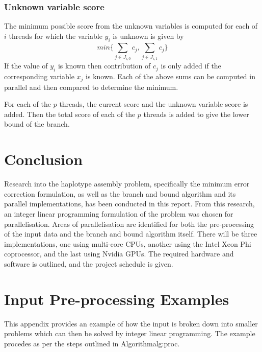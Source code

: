 \documentclass[10pt,a4paer,twocolumn]{article}
\begin{document}
\subsubsection{Unknown variable score}
The minimum possible score from the unknown variables is computed for each of $i$ threads for which the
variable $y_i$ is unknown is given by
\begin{equation*}
    min\{\sum_{j \in J_{i,0}}^{}{c_j}, \sum_{j \in J_{i,1}}^{}{c_j}\} 
\end{equation*}
If the value of $y_i$ is known then contribution of $c_j$ is only added if the corresponding variable $x_j$ is
known.
Each of the above sums can be computed in parallel and then compared to determine the minimum. 

For each of the $p$ threads, the current score and the unknown variable score is added. Then the total score
of each of the $p$ threads is added to give the lower bound of the branch.


\section{Conclusion} \label{sec:conc}

Research into the haplotype assembly problem, specifically the minimum error correction formulation, as well
as the branch and bound algorithm and its parallel implementations, has been conducted in this report. From
this research, an integer linear programming formulation of the problem was chosen for parallelisation.
Areas of parallelisation are identified for both the pre-processing of the input data and the branch and bound
algorithm itself. There will be three implementations, one using multi-core CPUs, another using the Intel Xeon
Phi coprocessor, and the last using Nvidia GPUs. The required hardware and software is outlined, and the 
project schedule is given. 




\clearpage 

\appendix

\section{Input Pre-processing Examples } \label{app:inpre}

This appendix provides an example of how the input is broken down into smaller problems which can then be 
solved by integer linear programming. The example procedes as per the steps outlined in Algorithm{alg:proc}.
\end{document}
